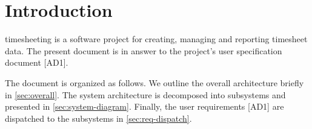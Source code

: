 \section{Introduction}
timesheeting is a software project for creating, managing and reporting
timesheet data. The present document is in answer to the project's user
specification document [AD1].

The document is organized as follows. We outline the overall architecture
briefly in \cref{sec:overall}. The system architecture is decomposed into
subsystems and presented in \cref{sec:system-diagram}. Finally,
the user requirements [AD1] are dispatched to the subsystems in
\cref{sec:req-dispatch}.
